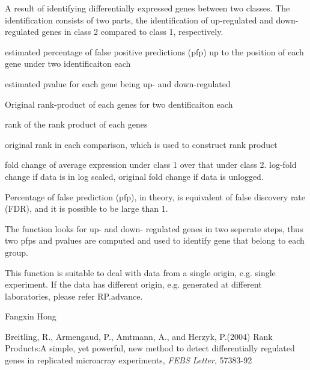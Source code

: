 \begin{Value}
A result of identifying differentially expressed genes 
between two classes. The identification consists of two parts,
the identification of  up-regulated  and down-regulated genes in 
class 2 compared to class 1, respectively.


\begin{ldescription}
\item[\code{pfp}] estimated percentage of false positive predictions
(pfp) up to  the position of each gene under two 
identificaiton each
\item[\code{pval}] estimated pvalue for each gene being up- and down-regulated
\item[\code{RPs}] Original rank-product of each genes for two 
dentificaiton each 
\item[\code{RPrank}] rank of the rank product of each genes
\item[\code{Orirank}] original rank in each comparison, which 
is used to construct rank product
\item[\code{AveFC}] fold change of average expression under class 1 over 
that under class 2. log-fold change if data is in log 
scaled, original fold change if data is unlogged. 
\end{ldescription}
\end{Value}
\begin{Note}\relax
Percentage of false prediction (pfp), in theory, is 
equivalent of false 
discovery rate (FDR), and it is possible to be large than 1.

The function looks for up- and down- regulated genes in two
seperate steps, thus two pfps and pvalues are computed and used to identify 
gene that belong to each group.   

This function is suitable to deal with data from a 
single origin, e.g. single  experiment. If the data has 
different origin, e.g. generated at different 
laboratories, please refer RP.advance.
\end{Note}
\begin{Author}\relax
Fangxin Hong 
\end{Author}
\begin{References}\relax
Breitling, R., Armengaud, P., Amtmann, A., and Herzyk, 
P.(2004) Rank Products:A simple, yet powerful, new method to 
detect differentially regulated genes in
replicated microarray experiments, \emph{FEBS Letter}, 57383-92
\end{References}
\begin{SeeAlso}\relax
{}     
\end{SeeAlso}
